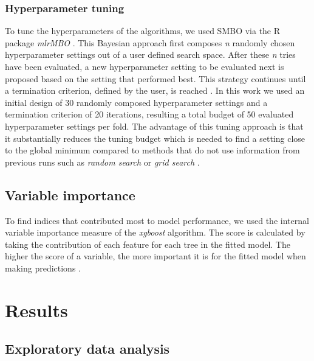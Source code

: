 \documentclass[review]{elsarticle}
\begin{document}

\subsubsection{Hyperparameter tuning}
To tune the hyperparameters of the algorithms, we used \ac{SMBO} via the R package \textit{mlrMBO} \citep{mlrMBO}.
This Bayesian approach first composes \textit{n} randomly chosen hyperparameter settings out of a user defined search space.
After these \textit{n} tries have been evaluated, a new hyperparameter setting to be evaluated next is proposed based on the setting that performed best.
This strategy continues until a termination criterion, defined by the user, is reached \citep{Hutter2011, Jones1998}.
In this work we used an initial design of 30 randomly composed hyperparameter settings and a termination criterion of 20 iterations, resulting a total budget of 50 evaluated hyperparameter settings per fold.
The advantage of this tuning approach is that it substantially reduces the tuning budget which is needed to find a setting close to the global minimum compared to methods that do not use information from previous runs such as \textit{random search} or \textit{grid search} \citep{Bergstra2012}.

\subsection{Variable importance}

To find indices that contributed most to model performance, we used the internal variable importance measure of the \textit{xgboost} algorithm.
The score is calculated by taking the contribution of each feature for each tree in the fitted model.
The higher the score of a variable, the more important it is for the fitted model when making predictions \citep{chenXGBoostScalableTree2016}.


\section{Results}

\subsection{Exploratory data analysis}
\end{document}
